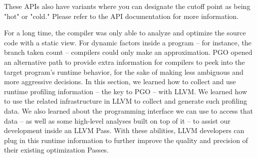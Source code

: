 These APIs also have variants where you can designate the cutoff point as being "hot" or "cold." Please refer to the API documentation for more information.

For a long time, the compiler was only able to analyze and optimize the source code with a static view. For dynamic factors inside a program – for instance, the branch taken count – compilers could only make an approximation. PGO opened an alternative path to provide extra information for compilers to peek into the target program's runtime behavior, for the sake of making less ambiguous and more aggressive decisions. In this section, we learned how to collect and use runtime profiling information – the key to PGO – with LLVM. We learned how to use the related infrastructure in LLVM to collect and generate such profiling data. We also learned about the programming interface we can use to access that data – as well as some high-level analyses built on top of it – to assist our development inside an LLVM Pass. With these abilities, LLVM developers can plug in this runtime information to further improve the quality and precision of their existing optimization Passes.















